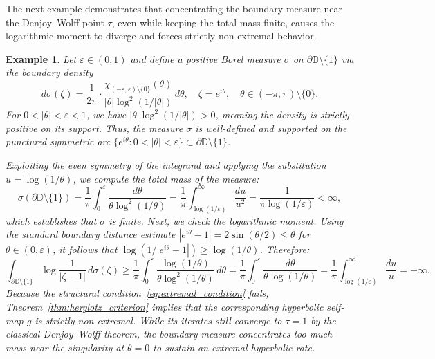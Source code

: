 \documentclass[10pt,a4paper]{amsart}
\numberwithin{equation}{section}
\newtheorem{example}[equation]{Example}
\begin{document}
The next example demonstrates that concentrating the boundary measure near the Denjoy--Wolff point $\tau$, even while keeping the total mass finite, causes the logarithmic moment to diverge and forces strictly non-extremal behavior.
\begin{example}
\label{ex:concentrated}
Let $\varepsilon\in(0,1)$ and define a positive Borel measure $\sigma$ on $\partial\mathbb{D}\setminus\{1\}$ via the boundary density
\begin{equation}
\label{eq:conc_measure}
d\sigma(\zeta)
=\frac{1}{2\pi}
\cdot
\frac{\chi_{(-\varepsilon,\varepsilon)\setminus\{0\}}(\theta)}
{|\theta|\log^2(1/|\theta|)}
\,d\theta,
\quad\zeta=e^{i\theta},
\quad\theta\in(-\pi,\pi)\setminus\{0\}.
\end{equation}
For $0 < |\theta| < \varepsilon < 1$, we have $|\theta|\log^2(1/|\theta|)>0$, meaning the density is strictly positive on its support. Thus, the measure $\sigma$ is well-defined and supported on the punctured symmetric arc $\{e^{i\theta}:0 < |\theta|<\varepsilon\} \subset\partial\mathbb{D}\setminus\{1\}$.

Exploiting the even symmetry of the integrand and applying the substitution $u=\log(1/\theta)$, we compute the total mass of the measure:
\begin{equation*}
\sigma(\partial\mathbb{D}\setminus\{1\})
=\frac{1}{\pi}\int_0^{\varepsilon}
\frac{d\theta}{\theta\log^2(1/\theta)}
=\frac{1}{\pi}\int_{\log(1/\varepsilon)}^{\infty}
\frac{du}{u^2}
=\frac{1}{\pi\log(1/\varepsilon)}<\infty,
\end{equation*}
which establishes that $\sigma$ is finite. Next, we check the logarithmic moment. Using the standard boundary distance estimate $|e^{i\theta}-1| = 2\sin(\theta/2)\le\theta$ for $\theta\in(0,\varepsilon)$, it follows that $\log(1/|e^{i\theta}-1|) \ge \log(1/\theta)$. Therefore:
\begin{equation*}
\int_{\partial\mathbb{D}\setminus\{1\}}
\log\frac{1}{|\zeta-1|}\,d\sigma(\zeta)
\ge\frac{1}{\pi}\int_0^{\varepsilon}
\frac{\log(1/\theta)}{\theta\log^2(1/\theta)}\,d\theta
=\frac{1}{\pi}\int_0^{\varepsilon}
\frac{d\theta}{\theta\log(1/\theta)}
=\frac{1}{\pi}\int_{\log(1/\varepsilon)}^{\infty}
\frac{du}{u}=+\infty.
\end{equation*}
Because the structural condition~\eqref{eq:extremal_condition} fails, Theorem~\ref{thm:herglotz_criterion} implies that the corresponding hyperbolic self-map $g$ is strictly non-extremal. While its iterates still converge to $\tau=1$ by the classical Denjoy--Wolff theorem, the boundary measure concentrates too much mass near the singularity at $\theta=0$ to sustain an extremal hyperbolic rate.
\end{example}
\end{document}
